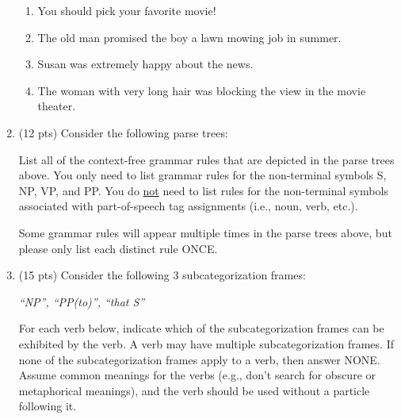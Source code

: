 \documentclass[11pt]{article}
\begin{document}
\begin{enumerate}
\begin{enumerate}
\item You should pick your favorite movie!
\vspace*{.5in}

\item The old man promised the boy a lawn mowing job in summer.
\vspace*{.5in}

\item Susan was extremely happy about the news.
\vspace*{.5in}

\item The woman with very long hair was blocking the view in the movie theater.
\vspace*{.5in}


\end{enumerate}


\newpage

\item (12 pts) Consider the following parse trees:

 \begin{center}
 \end{center}

 List all of the context-free grammar rules that are depicted in the parse
 trees above.  You only need to list grammar rules for the
 non-terminal symbols S, NP, VP, and PP. You do \underline{not} need
 to list rules for the non-terminal symbols associated with part-of-speech tag
 assignments (i.e., noun, verb, etc.).

  Some grammar rules will appear multiple times in the parse trees
  above, but please only list each   distinct rule ONCE.


\newpage

\item (15 pts)   Consider the following 3 subcategorization frames:
\begin{center}
{\it ``NP'', ``PP(to)'', ``that S''}
\end{center}

For each verb below, indicate which of the subcategorization frames
can be exhibited by the verb. A verb may have multiple
subcategorization frames.  If none of the subcategorization frames
apply to a verb, then answer NONE.  Assume common meanings for the
verbs (e.g., don't search for obscure or metaphorical meanings), and
the verb should be used without a particle following it.


\end{enumerate}
\end{document}
